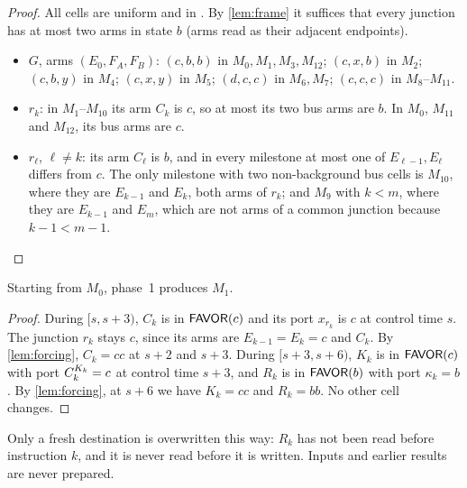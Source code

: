 \begin{proof}
All cells are uniform and in \HOLD. By \cref{lem:frame} it suffices that every junction has at
most two arms in state $b$ (arms read as their adjacent endpoints).
\begin{itemize}
\item $G$, arms $(E_0,F_A,F_B)$: $(c,b,b)$ in $M_0,M_1,M_3,M_{12}$; $(c,x,b)$ in $M_2$; $(c,b,y)$
  in $M_4$; $(c,x,y)$ in $M_5$; $(d,c,c)$ in $M_6,M_7$; $(c,c,c)$ in $M_8$--$M_{11}$.
\item $r_k$: in $M_1$--$M_{10}$ its arm $C_k$ is $c$, so at most its two bus arms are $b$. In $M_0$,
  $M_{11}$ and $M_{12}$, its bus arms are $c$.
\item $r_\ell$, $\ell\ne k$: its arm $C_\ell$ is $b$, and in every milestone at most one of
  $E_{\ell-1},E_\ell$ differs from $c$. The only milestone with two non-background bus cells is
  $M_{10}$, where they are $E_{k-1}$ and $E_k$, both arms of $r_k$; and $M_9$ with $k<m$, where
  they are $E_{k-1}$ and $E_m$, which are not arms of a common junction because $k-1<m-1$.\qedhere
\end{itemize}
\end{proof}

\begin{lemma}\label{lem:prepare}
Starting from $M_0$, phase~1 produces $M_1$.
\end{lemma}

\begin{proof}
During $[s,s+3)$, $C_k$ is in $\textsf{FAVOR}(c)$ and its port $x_{r_k}$ is $c$ at control time $s$. The
junction $r_k$ stays $c$, since its arms are $E_{k-1}=E_k=c$ and $C_k$. By \cref{lem:forcing},
$C_k=cc$ at $s+2$ and $s+3$. During $[s+3,s+6)$, $K_k$ is in $\textsf{FAVOR}(c)$ with port $C_k^{K_k}=c$ at
control time $s+3$, and $R_k$ is in $\textsf{FAVOR}(b)$ with port $\kappa_k=b$. By \cref{lem:forcing}, at $s+6$
we have $K_k=cc$ and $R_k=bb$. No other cell changes.
\end{proof}

Only a fresh destination is overwritten this way: $R_k$ has not been read before instruction $k$,
and it is never read before it is written. Inputs and earlier results are never prepared.

